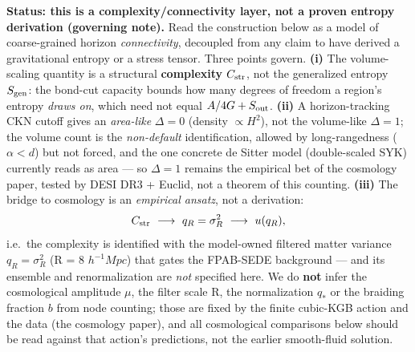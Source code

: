 \documentclass[aps,prd,preprint,nofootinbib,superscriptaddress]{revtex4-2}
\begin{document}
\textbf{Status: this is a complexity/connectivity layer, not a proven
entropy derivation (governing note).} Read the construction below as a
model of coarse-grained horizon \emph{connectivity}, decoupled from any
claim to have derived a gravitational entropy or a stress tensor. Three
points govern. \textbf{(i)} The volume-scaling quantity is a structural
\textbf{complexity} \(C_{\rm str}\), not the generalized entropy
\(S_{\rm gen}\): the bond-cut capacity bounds how many degrees of
freedom a region's entropy \emph{draws on}, which need not equal
\(A/4G + S_{\rm out}\). \textbf{(ii)} A horizon-tracking CKN cutoff
gives an \emph{area-like} \(\Delta = 0\) (density \(\propto H^2\)), not
the volume-like \(\Delta = 1\); the volume count is the
\emph{non-default} identification, allowed by long-rangedness
(\(\alpha < d\)) but not forced, and the one concrete de Sitter model
(double-scaled SYK) currently reads as area --- so \(\Delta = 1\)
remains the empirical bet of the cosmology paper, tested by DESI DR3 +
Euclid, not a theorem of this counting. \textbf{(iii)} The bridge to
cosmology is an \emph{empirical ansatz}, not a derivation:
\begin{equation}C_{\rm str}\ \longrightarrow\ q_R = \sigma_R^2\ \longrightarrow\ u(q_R),\end{equation}
i.e.~the complexity is identified with the model-owned filtered matter
variance \(q_R = \sigma_R^2\) (R = 8 \(h^{-1}Mpc\)) that gates the
FPAB-SEDE background --- and its ensemble and renormalization are
\emph{not} specified here. We do \textbf{not} infer the cosmological
amplitude \(\mu\), the filter scale R, the normalization \(q_*\) or the
braiding fraction \(b\) from node counting; those are fixed by the
finite cubic-KGB action and the data (the cosmology paper), and all
cosmological comparisons below should be read against that action's
predictions, not the earlier smooth-fluid solution.
\end{document}
